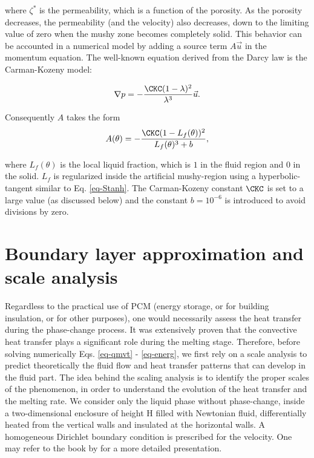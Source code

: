 \noindent where $\zeta^*$ is the permeability, which is a function of the porosity.
As the porosity decreases, the permeability (and the velocity) also decreases, down to the limiting value of zero when the mushy zone becomes completely solid.
This behavior can be accounted in a numerical model by adding a source term $A \vec u$ in the momentum equation.
The well-known equation derived from the Darcy law is the Carman-Kozeny model:

\begin{equation} \label{ck eq}
	\nabla p = - \frac{\CKC (1 - \lambda)^2}{\lambda^3} \vec u.
\end{equation}

\noindent Consequently $A$ takes the form \citep{Belhamadia2012,kheirabadi2015effect}
\begin{equation}\label{eq-CK}
A(\theta) = -\frac{\CKC (1 - L_f(\theta))^2}{L_f(\theta)^3 + b}, 
\end{equation}

\noindent where $L_f(\theta)$ is the local liquid fraction, which is  $1$ in the fluid region and  $0$ in the solid. $L_f$ is regularized inside the artificial  mushy-region using a hyperbolic-tangent similar to Eq. \eqref{eq-Stanh}.
The Carman-Kozeny constant $\CKC$ is set to a  large value (as discussed below) and  the constant $b=10^{-6}$ is introduced to avoid divisions by zero.

\section{Boundary layer approximation and scale analysis} \label{sec-bound-scal-anal}
Regardless to the practical use of PCM (energy storage, or for building insulation, or for other purposes), one would necessarily assess the heat transfer during the phase-change process.
It was extensively proven that the convective heat transfer plays a significant role during the melting stage.
Therefore, before solving numerically Eqs. \eqref{eq-qmvt} - \eqref{eq-energ}, we first rely on a scale analysis to predict theoretically the fluid flow and heat transfer patterns that can develop in the fluid part.
The idea behind the scaling analysis is to identify the proper scales of the phenomenon, in order to understand the evolution of the heat transfer and the melting rate.
We consider only the liquid phase without phase-change, inside a two-dimensional enclosure of height H filled with Newtonian fluid, differentially heated from the vertical walls and insulated at the horizontal walls.
A homogeneous Dirichlet boundary condition is prescribed for the velocity. 
One may refer to the book by \cite{bejan2013convection} for a more detailed presentation.

